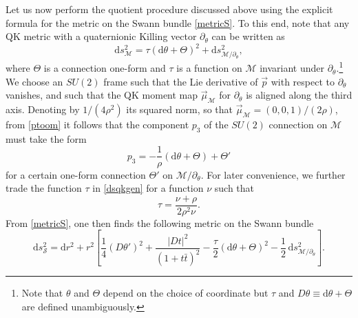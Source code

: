 \documentclass[12pt,reqno]{article}
\numberwithin{equation}{section}
\newcommand{\be}{\begin{equation}}
\newcommand{\ee}{\end{equation}}
\def\({\left(}
\def\){\right)}
\def\[{\left[}
\def\]{\right]}
\def\p{\partial}
\newcommand{\de}{\mathrm{d}}
\newcommand{\cS}{\mathcal{S}}
\newcommand{\cM}{\mathcal{M}}
\def\pa{\partial}
\def\varpiqk{t}
\def\sigp{{\theta}}
\def\phip{{\theta'}}
\def\pTheta{\Theta'}
\def\cff{\tau} %
\def\cfff{\nu} %
\numberwithin{equation}{section}
\begin{document}
Let us now perform the quotient procedure discussed above
using the explicit formula for the metric on the Swann bundle \eqref{metricS}.
To this end, note that any QK metric with a quaternionic Killing vector $\pa_\sigp$ can be written as
\be
\label{dsqkgen}
\de s^2_{\cM} =  \cff \(\de\sigp+\Theta\)^2 + \de s^2_{\cM/\pa_\sigp},
\ee
where $\Theta$ is a connection one-form and $\cff$ is a function on $\cM$ invariant
under $\pa_\sigp$.\footnote{Note that $\sigp$ and $\Theta$ depend on the choice of coordinate but
$\cff$ and $D\sigp\equiv \de\sigp+\Theta$ are defined unambiguously.}
We choose an $SU(2)$ frame such that the Lie derivative of $\vec p$
with respect to $\pa_\sigp$ vanishes, and such that the QK moment map $\vec \mu_{\cM}$
for $\pa_\sigp$ is aligned along the third axis. Denoting  by
$1/(4\rho^2)$ its squared norm, so that $\vec \mu_{\cM} = (0,0,1)/(2\rho)$,
from \eqref{ptoom} it follows that the component
$p_3$ of the $SU(2)$ connection on $\cM$ must take the form
\be
p_3 = - \frac{1}{\rho} \( \de \sigp + \Theta\) + \pTheta
\label{genformp3}
\ee
for a certain one-form connection $\pTheta$ on $\cM/\p_\sigp$. For later convenience,
we further trade the function $\tau$ in \eqref{dsqkgen} for a function $\cfff$ such that
\be
\label{defcfff}
\cff=\frac{\cfff+\rho}{2\rho^2\cfff}.
\ee
From \eqref{metricS}, one then finds the following metric on the Swann bundle
\be
\de s^2_\cS=\de r^2+r^2\[\frac{1}{4}\(D \phip\)^2
+ \frac{|D \varpiqk|^2}{(1+\varpiqk\bar\varpiqk)^2}-\frac{\cff}{2} \(\de\sigp+\Theta\)^2
-\frac12 \,\de s^2_{\cM/\pa_\sigp}  \].
\ee
\end{document}
